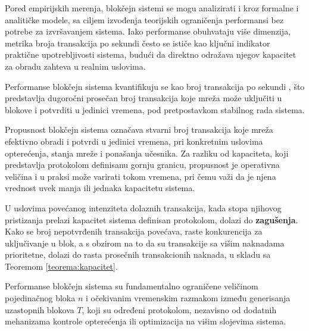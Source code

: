 Pored empirijskih merenja, blokčejn sistemi se mogu analizirati i kroz formalne i analitičke modele, sa ciljem izvođenja teorijskih ograničenja performansi bez potrebe za izvršavanjem sistema. Iako performanse obuhvataju više dimenzija, metrika broja transakcija po sekundi često se ističe kao ključni indikator praktične upotrebljivosti sistema, budući da direktno odražava njegov kapacitet za obradu zahteva u realnim uslovima.

\begin{definicija}
Performanse blokčejn sistema kvantifikuju se kao broj transakcija po sekundi , što predstavlja dugoročni prosečan broj transakcija koje mreža može uključiti u blokove i potvrditi u jedinici vremena, pod pretpostavkom stabilnog rada sistema.
\end{definicija}

Propusnost  blokčejn sistema označava stvarni broj transakcija koje mreža efektivno obradi i potvrdi u jedinici vremena, pri konkretnim uslovima opterećenja, stanja mreže i ponašanja učesnika. Za razliku od kapaciteta, koji predstavlja protokolom definisanu gornju granicu, propusnost je operativna veličina i u praksi može varirati tokom vremena, pri čemu važi da je njena vrednost uvek manja ili jednaka kapacitetu sistema.

U uslovima povećanog intenziteta dolaznih transakcija, kada stopa njihovog pristizanja prelazi kapacitet sistema definisan protokolom, dolazi do \textbf{zagušenja}. Kako se broj nepotvrđenih transakcija povećava, raste konkurencija za uključivanje u blok, a s obzirom na to da su transakcije sa višim naknadama prioritetne, dolazi do rasta prosečnih transakcionih naknada, u skladu sa Teoremom \ref{teorema:kapacitet}.

\begin{posledica}\label{teorema:performanse}
Performanse blokčejn sistema su fundamentalno ograničene veličinom pojedinačnog bloka $n$ i očekivanim vremenskim razmakom između generisanja uzastopnih blokova $T$, koji su određeni protokolom, nezavisno od dodatnih mehanizama kontrole opterećenja ili optimizacija na višim slojevima sistema.
\end{posledica}


